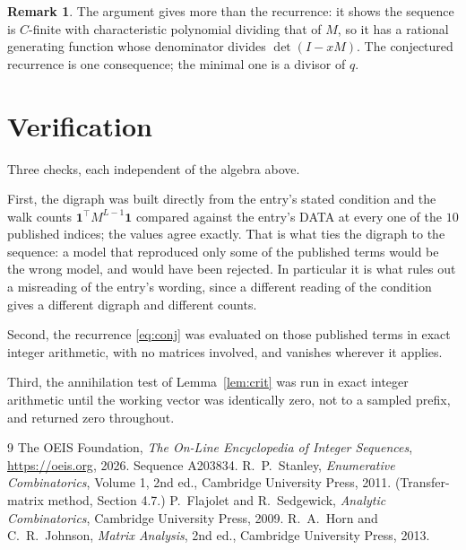 \documentclass[11pt,a4paper]{article}
\theoremstyle{plain}
\theoremstyle{definition}
\newtheorem{remark}[theorem]{Remark}
\begin{document}
\begin{remark}
The argument gives more than the recurrence: it shows the sequence is $C$-finite with
characteristic polynomial dividing that of $M$, so it has a rational generating function
whose denominator divides $\det(I-xM)$. The conjectured recurrence is one consequence; the
minimal one is a divisor of $q$.
\end{remark}

\section{Verification}

Three checks, each independent of the algebra above.

First, the digraph was built directly from the entry's stated condition and the walk counts
$\mathbf{1}^{\!\top}M^{L-1}\mathbf{1}$ compared against the entry's DATA at
every one of the $10$ published indices; the values agree exactly. That is what ties
the digraph to the sequence: a model that reproduced only some of the published terms would
be the wrong model, and would have been rejected. In particular it is what rules out a
misreading of the entry's wording, since a different reading of the condition gives a
different digraph and different counts.

Second, the recurrence \eqref{eq:conj} was evaluated on those published terms in exact
integer arithmetic, with no matrices involved, and vanishes wherever it applies.

Third, the annihilation test of Lemma~\ref{lem:crit} was run in exact integer arithmetic
until the working vector was identically zero, not to a sampled prefix, and returned zero
throughout.

\begin{thebibliography}{9}
 The OEIS Foundation, \emph{The On-Line Encyclopedia of Integer
Sequences}, \url{https://oeis.org}, 2026. Sequence A203834.
 R.~P.~Stanley, \emph{Enumerative Combinatorics}, Volume 1, 2nd ed.,
Cambridge University Press, 2011. (Transfer-matrix method, Section 4.7.)
 P.~Flajolet and R.~Sedgewick, \emph{Analytic Combinatorics}, Cambridge
University Press, 2009.
 R.~A.~Horn and C.~R.~Johnson, \emph{Matrix Analysis}, 2nd ed., Cambridge
University Press, 2013.
\end{thebibliography}
\end{document}
